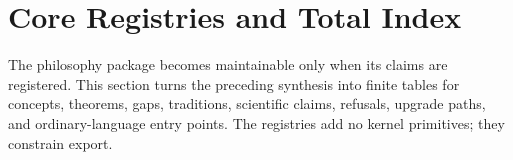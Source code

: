 \section{Core Registries and Total Index}
\label{sec:visions-philosophy-core-registries}

The philosophy package becomes maintainable only when its claims are
registered. This section turns the preceding synthesis into finite
tables for concepts, theorems, gaps, traditions, scientific claims,
refusals, upgrade paths, and ordinary-language entry points. The
registries add no kernel primitives; they constrain export.







